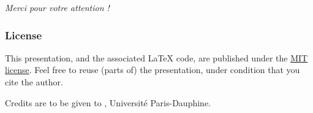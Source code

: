 \documentclass[french]{beamer}
\begin{document}
\begin{frame}[plain]
	\addtocounter{framenumber}{-1}
	\begin{center}
		\huge
		\textit{Merci pour votre attention !}
	\end{center}
\end{frame}

\appendix
\AtBeginSection{
}

\begin{frame}[allowframebreaks]
	\frametitle{\refname}
  
\end{frame}

\clearpage{}
\begin{frame}[plain]
	\frametitle{License}
	This presentation, and the associated \LaTeX{} code, are published under the \href{https://opensource.org/licenses/MIT}{MIT license}. Feel free to reuse (parts of) the presentation, under condition that you cite the author.
	
	Credits are to be given to , Université Paris-Dauphine.
\end{frame}
\addtocounter{framenumber}{-1}
\end{document}
